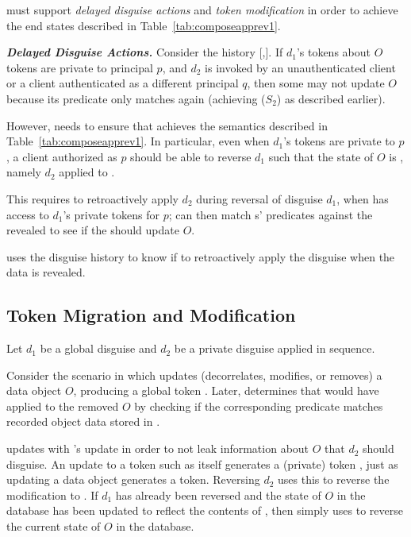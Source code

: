 \sys must support \emph{delayed disguise actions} and \emph{token modification} in order to
achieve the end states described in Table~\ref{tab:composeapprev1}. 

\noindent\textbf{\emph{Delayed Disguise Actions.}}
Consider the history [,].
If $d_1$'s tokens about $O$ tokens are private to principal $p$, and $d_2$ is invoked by an unauthenticated client or
a client authenticated as a different principal $q$, then some  may not update $O$ because
its predicate only matches again \ohist{[\app{d_1}]} (achieving ($S_2$) as described earlier).

However, \sys needs to ensure that  achieves the semantics described in
Table~\ref{tab:composeapprev1}. In particular, even when $d_1$'s tokens are private to $p$, a client
authorized as $p$ should be able to reverse $d_1$ such that the state of $O$ is \ohist{[\app{d_2}]},
namely $d_2$ applied to \ostart. 

This requires \sys to retroactively apply $d_2$ during reversal of disguise $d_1$, when \sys has
access to $d_1$'s private tokens for $p$; \sys can then match s' predicates against the
revealed \ostart to see if the  should update $O$.

\sys uses the disguise history to know if to retroactively apply the
disguise when the data is revealed.  


\subsection{Token Migration and Modification}
Let $d_1$ be a global disguise and $d_2$ be a private disguise applied in sequence.

Consider the scenario in which  updates (decorrelates, modifies, or removes) a data object
$O$, producing a global token . Later, \sys determines that  would have applied to the
removed $O$ by checking if the corresponding  predicate matches recorded object data stored in .

\sys updates  with 's update in order to not leak information about $O$ that $d_2$ should disguise. An update to a token such as  itself generates a (private) token , just as updating a data object generates a token. Reversing $d_2$ uses this  to reverse the modification to . If $d_1$ has
already been reversed and the state of $O$ in the database has been updated to reflect the contents of ,
then \sys simply uses  to reverse the current state of $O$ in the database. 

